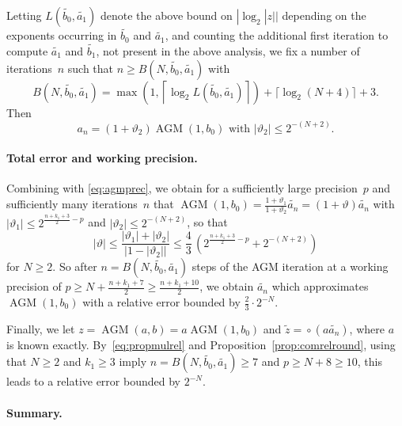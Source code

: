 \documentclass [11pt]{article}
\newcommand {\corr}[1]{{#1}}
\newcommand {\appro}[1]{\widetilde {#1}}
\newcommand {\round}{\operatorname {\circ}}
\renewcommand {\theta}{\vartheta}
\renewcommand {\leq}{\leqslant}
\renewcommand {\geq}{\geqslant}
\newcommand {\AGM}{\operatorname{AGM}}
\begin{document}
Letting $L (\appro {b_0}, \appro {a_1})$ denote the above bound on
$|\log_2 |z||$ depending on the exponents occurring in $\appro {b_0}$
and $\appro {a_1}$, and counting the additional first iteration to compute
$\appro {a_1}$ and $\appro {b_1}$, not present in the above analysis,
we fix a number of iterations~$n$ such that
$n \geq B (N, \appro {b_0}, \appro {a_1})$ with
\begin{equation}
\label{eq:agmbound}
B (N, \appro {b_0}, \appro {a_1})
= \max \left( 1,
   \left\lceil \log_2 L (\appro {b_0}, \appro {a_1}) \right\rceil \right)
+ \lceil \log_2 (N+4) \rceil + 3.
\end{equation}
Then
\[
\corr {a_n} = (1 + \theta_2) \AGM (1, \corr {b_0})
\text { with }
|\theta_2| \leq 2^{-(N+2)}.
\]


\paragraph {Total error and working precision.}

Combining with \eqref {eq:agmprec}, we obtain for a sufficiently large
precision~$p$ and sufficiently many iterations~$n$ that
$\AGM (1, b_0) = \frac {1 + \theta_1}{1 + \theta_2} \appro {a_n}
= (1 + \theta) \appro {a_n}$ with
$|\theta_1| \leq 2^{\frac {n + k_1 + 3}{2} - p}$ and
$|\theta_2| \leq 2^{-(N+2)}$, so that
\[
|\theta| \leq \frac {|\theta_1| + |\theta_2|}{|1 - |\theta_2||}
\leq \frac {4}{3} \, \left( 2^{\frac {n+k_1+3}{2}-p} + 2^{-(N+2)} \right)
\]
for $N \geq 2$.
So after $n = B (N, \appro {b_0}, \appro {a_1})$ steps of the AGM iteration
at a working precision of
$p \geq N + \frac {n + k_1 + 7}{2} \geq \frac {n + k_1 + 10}{2}$,
we obtain $\appro {a_n}$ which approximates $\AGM (1, b_0)$ with a
relative error bounded by $\frac {2}{3} \cdot 2^{-N}$.

Finally, we let $\corr {z} = \AGM (a, b) = a \AGM (1, \corr {b_0})$ and
$\appro {z} = \round (\corr {a} \appro {a_n})$, where $a$ is known
exactly.
By~\eqref {eq:propmulrel} and Proposition~\ref {prop:comrelround},
using that $N \geq 2$ and $k_1 \geq 3$ imply
$n = B (N, \appro {b_0}, \appro {a_1}) \geq 7$ and
$p \geq N + 8 \geq 10$,
this leads to a relative error bounded by $2^{-N}$.


\paragraph {Summary.}
\end{document}
